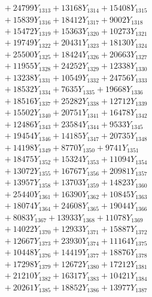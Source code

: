 \documentclass[a4paper,10pt]{article}
\begin{document}
{\begin{align}
&\;  + 24799 Y_{1313} + 13168 Y_{1314} + 15408 Y_{1315} \\[0.3ex]
&\;  + 15839 Y_{1316} + 18412 Y_{1317} + 9002 Y_{1318} \\[0.5ex]\allowbreak
&\;  + 15472 Y_{1319} + 15363 Y_{1320} + 10273 Y_{1321} \\[0.3ex]
&\;  + 19749 Y_{1322} + 20431 Y_{1323} + 18130 Y_{1324} \\[0.3ex]
&\;  + 25500 Y_{1325} + 18424 Y_{1326} + 20663 Y_{1327} \\[0.3ex]
&\;  + 11955 Y_{1328} + 24252 Y_{1329} + 12338 Y_{1330} \\[0.3ex]
&\;  + 13238 Y_{1331} + 10549 Y_{1332} + 24756 Y_{1333} \\[0.3ex]
&\;  + 18532 Y_{1334} + 7635 Y_{1335} + 19668 Y_{1336} \\[0.3ex]
&\;  + 18516 Y_{1337} + 25282 Y_{1338} + 12712 Y_{1339} \\[0.3ex]
&\;  + 15502 Y_{1340} + 20751 Y_{1341} + 16478 Y_{1342} \\[0.3ex]
&\;  + 12486 Y_{1343} + 23584 Y_{1344} + 9533 Y_{1345} \\[0.3ex]
&\;  + 19454 Y_{1346} + 14185 Y_{1347} + 20735 Y_{1348} \\[0.5ex]\allowbreak
&\;  + 14198 Y_{1349} + 8770 Y_{1350} + 9741 Y_{1351} \\[0.3ex]
&\;  + 18475 Y_{1352} + 15324 Y_{1353} + 11094 Y_{1354} \\[0.3ex]
&\;  + 13072 Y_{1355} + 16767 Y_{1356} + 20981 Y_{1357} \\[0.3ex]
&\;  + 13957 Y_{1358} + 13703 Y_{1359} + 14823 Y_{1360} \\[0.3ex]
&\;  + 25440 Y_{1361} + 16390 Y_{1362} + 10845 Y_{1363} \\[0.3ex]
&\;  + 18074 Y_{1364} + 24608 Y_{1365} + 19044 Y_{1366} \\[0.3ex]
&\;  + 8083 Y_{1367} + 13933 Y_{1368} + 11078 Y_{1369} \\[0.3ex]
&\;  + 14022 Y_{1370} + 12933 Y_{1371} + 15887 Y_{1372} \\[0.3ex]
&\;  + 12667 Y_{1373} + 23930 Y_{1374} + 11164 Y_{1375} \\[0.3ex]
&\;  + 10448 Y_{1376} + 14419 Y_{1377} + 18876 Y_{1378} \\[0.5ex]\allowbreak
&\;  + 17298 Y_{1379} + 12672 Y_{1380} + 17212 Y_{1381} \\[0.3ex]
&\;  + 21210 Y_{1382} + 16317 Y_{1383} + 10421 Y_{1384} \\[0.3ex]
&\;  + 20261 Y_{1385} + 18852 Y_{1386} + 13977 Y_{1387} \\[0.3ex]

\end{align}}
\end{document}
